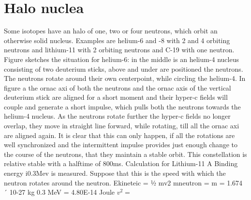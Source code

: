 \chapter{Halo nuclea}



Some isotopes have an halo of one, two or four neutrons, which orbit an otherwise solid nucleus. Examples are helium-6 and -8 with 2 and 4 orbiting neutrons and lithium-11 with 2 orbiting neutrons and C-19 with one neutron. Figure sketches the situation for helium-6: in the middle is an helium-4 nucleus consisting of two deuterium sticks, above and under are positioned the neutrons. The neutrons rotate around their own centerpoint, while circling the helium-4. In figure a the ornac axi of both the neutrons and the ornac axis of the vertical deuterium stick are aligned for a short moment and their hyper-c fields will couple and generate a short impulse, which pulls both the neutrons towards the helium-4 nucleus. As the neutrons rotate further the hyper-c fields no longer overlap, they move in  straight line forward, while rotating, till all the ornac axi are aligned again. It is clear that this can only happen, if all the rotations are well synchronized and the intermittent impulse provides just enough change to the course of the neutrons, that they maintain a stable orbit. This constellation is relative stable with 
a halftime of 800ms. Calculation for Lithium-11
A Binding energy i0.3Mev  is measured. Suppose that this is the speed with which the neutron rotates around the  neutron. Ekineteic  = ½ mv2
mneutron = m = 1.674 ´ 10-27 kg
0.3 MeV = 4.80E-14 Joule
$v^2 =$ 

